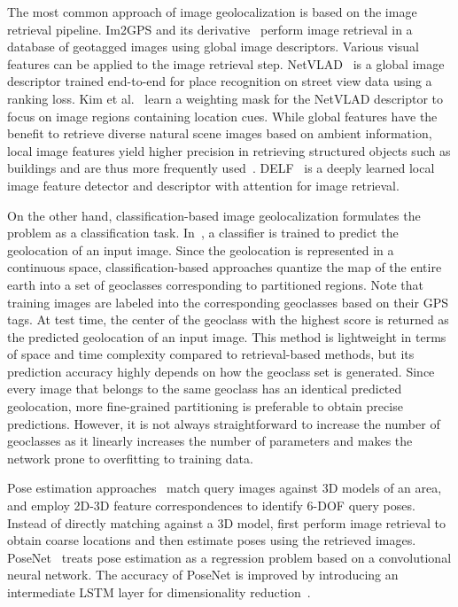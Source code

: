 \documentclass[runningheads]{llncs}
\begin{document}
The most common approach of image geolocalization is based on the image retrieval pipeline. 
Im2GPS \cite{hays08im2gps,hays15large} and its derivative~\cite{vo17revisiting} perform image retrieval in a database of geotagged images using global image descriptors. 
Various visual features can be applied to the image retrieval step.
NetVLAD~\cite{Arandjelovic16CVPR} is a global image descriptor trained end-to-end for place recognition on street view data using a ranking loss. 
Kim et al.~\cite{Kim17CVPR} learn a weighting mask for the NetVLAD descriptor to focus on image regions containing location cues. 
While global features have the benefit to retrieve diverse natural scene images based on ambient information, local image features yield higher precision in retrieving structured objects such as buildings and are thus more frequently used~\cite{Baatz10ECCV,Cao15IJCV,Chen11CVPR,Kim15ICCV,Knopp10ECCV,Philbin07CVPR,Schindler07CVPR,Zamir10ECCV,Zamir14PAMI}. 
DELF~\cite{Noh17ICCV} is a deeply learned local image feature detector and descriptor with attention for image retrieval.

On the other hand, classification-based image geolocalization formulates the problem as a classification task. 
In~\cite{vo17revisiting,weyand16planet}, a classifier is trained to predict the geolocation of an input image.
Since the geolocation is represented in a continuous space, classification-based approaches quantize the map of the entire earth into a set of geoclasses corresponding to partitioned regions.
Note that training images are labeled into the corresponding geoclasses based on their GPS tags.
At test time, the center of the geoclass with the highest score is returned as the predicted geolocation of an input image.
This method is lightweight in terms of space and time complexity compared to retrieval-based methods, but its prediction accuracy highly depends on how the geoclass set is generated.
Since every image that belongs to the same geoclass has an identical predicted geolocation, more fine-grained partitioning is preferable to obtain precise predictions.
However, it is not always straightforward to increase the number of geoclasses as it linearly increases the number of parameters and makes the network prone to overfitting to training data.


Pose estimation approaches~\cite{Cao15IJCV,Irschara09CVPR,Li10ECCV,Li12ECCV,Liu17ICCV,Sattler11ICCV,Sattler12BMVC} match  query images against 3D models of an area, and employ 2D-3D feature correspondences to identify 6-DOF query poses. 
Instead of directly matching against a 3D model, \cite{Sattler17CVPR,Sattler12BMVC} first perform image retrieval to obtain coarse locations and then estimate poses using the retrieved images.
PoseNet~\cite{Kendall17CVPR,Kendall15ICCV} treats pose estimation as a regression problem based on a convolutional neural network.
The accuracy of PoseNet is improved by introducing an intermediate LSTM layer for dimensionality reduction~\cite{Walch17ICCV}.
\end{document}
